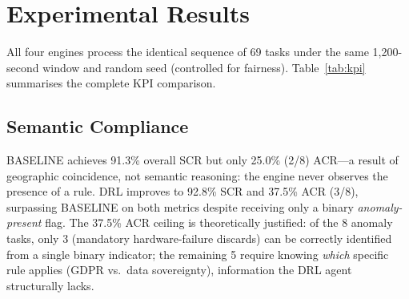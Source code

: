 \documentclass[conference,comsoc,twoside,caption=false]{IEEEtran}
\let\MYoriglatexcaption\caption
\renewcommand{\caption}[2][\relax]{\MYoriglatexcaption[#2]{#2}}
\theoremstyle{definition}
\begin{document}
\section{Experimental Results}
\label{sec:results}

All four engines process the identical sequence of 69 tasks
under the same 1{,}200-second window and random seed (controlled for fairness).
Table~\ref{tab:kpi} summarises the complete KPI comparison.

\begin{table}[!t]
\centering
\caption{KPI Comparison across Orchestration Paradigms (69 tasks, 1{,}200\,s)}
\label{tab:kpi}
\end{table}

\subsection{Semantic Compliance}

BASELINE achieves 91.3\% overall SCR but only
25.0\% (2/8) ACR---a result of geographic
coincidence, not semantic reasoning: the engine never observes the presence of
a rule. DRL improves to 92.8\% SCR and
37.5\% ACR (3/8), surpassing BASELINE on both
metrics despite receiving only a binary \emph{anomaly-present} flag. The 37.5\%
ACR ceiling is theoretically justified: of the 8 anomaly tasks, only 3
(mandatory hardware-failure discards) can be correctly identified from a single
binary indicator; the remaining 5 require knowing \emph{which} specific rule
applies (GDPR vs.\ data sovereignty), information the DRL agent structurally
lacks.
\end{document}
